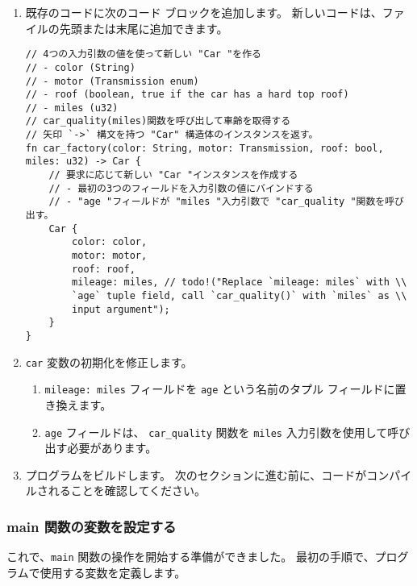\begin{enumerate}

\item 既存のコードに次のコード ブロックを追加します。 新しいコードは、ファイルの先頭または末尾に追加できます。

\begin{lstlisting}[numbers=none]
// 4つの入力引数の値を使って新しい "Car "を作る
// - color (String)
// - motor (Transmission enum)
// - roof (boolean, true if the car has a hard top roof)
// - miles (u32)
// car_quality(miles)関数を呼び出して車齢を取得する
// 矢印 `->` 構文を持つ "Car" 構造体のインスタンスを返す。
fn car_factory(color: String, motor: Transmission, roof: bool, miles: u32) -> Car {
    // 要求に応じて新しい "Car "インスタンスを作成する
    // - 最初の3つのフィールドを入力引数の値にバインドする
    // - "age "フィールドが "miles "入力引数で "car_quality "関数を呼び出す。
    Car {
        color: color,
        motor: motor,
        roof: roof,
        mileage: miles, // todo!("Replace `mileage: miles` with \\
        `age` tuple field, call `car_quality()` with `miles` as \\
        input argument");
    }
}
\end{lstlisting}

\item \texttt{car} 変数の初期化を修正します。

\begin{enumerate}
\item \texttt{mileage: miles} フィールドを \texttt{age} という名前のタプル フィールドに置き換えます。
\item \texttt{age} フィールドは、 \texttt{car\_quality} 関数を \texttt{miles} 入力引数を使用して呼び出す必要があります。
\end{enumerate}

\item プログラムをビルドします。 次のセクションに進む前に、コードがコンパイルされることを確認してください。

\end{enumerate}

\subsubsection{main 関数の変数を設定する}

これで、\texttt{main} 関数の操作を開始する準備ができました。 最初の手順で、プログラムで使用する変数を定義します。

